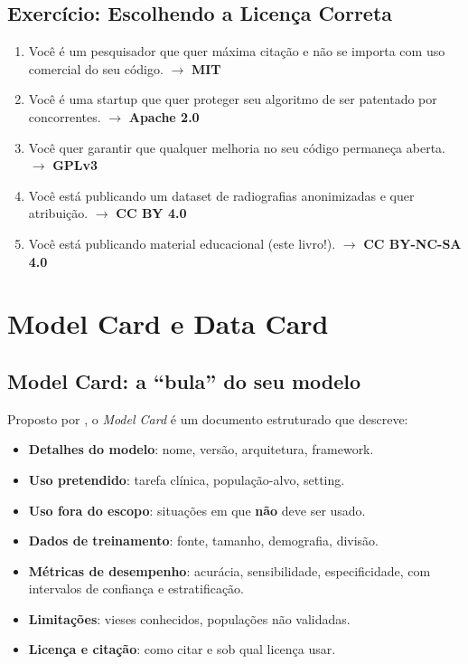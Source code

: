 
\subsection{Exercício: Escolhendo a Licença Correta}

\begin{enumerate}
  \item Você é um pesquisador que quer máxima citação e não se importa
    com uso comercial do seu código. $\rightarrow$ \textbf{MIT}
  \item Você é uma startup que quer proteger seu algoritmo de ser
    patentado por concorrentes. $\rightarrow$ \textbf{Apache 2.0}
  \item Você quer garantir que qualquer melhoria no seu código permaneça
    aberta. $\rightarrow$ \textbf{GPLv3}
  \item Você está publicando um dataset de radiografias anonimizadas e
    quer atribuição. $\rightarrow$ \textbf{CC BY 4.0}
  \item Você está publicando material educacional (este livro!).
    $\rightarrow$ \textbf{CC BY-NC-SA 4.0}
\end{enumerate}

\section{Model Card e Data Card}

\subsection{Model Card: a ``bula'' do seu modelo}

Proposto por , o \textit{Model Card} é um
documento estruturado que descreve:

\begin{itemize}
  \item \textbf{Detalhes do modelo}: nome, versão, arquitetura, framework.
  \item \textbf{Uso pretendido}: tarefa clínica, população-alvo, setting.
  \item \textbf{Uso fora do escopo}: situações em que \textbf{não} deve
    ser usado.
  \item \textbf{Dados de treinamento}: fonte, tamanho, demografia, divisão.
  \item \textbf{Métricas de desempenho}: acurácia, sensibilidade,
    especificidade, com intervalos de confiança e estratificação.
  \item \textbf{Limitações}: vieses conhecidos, populações não validadas.
  \item \textbf{Licença e citação}: como citar e sob qual licença usar.
\end{itemize}

